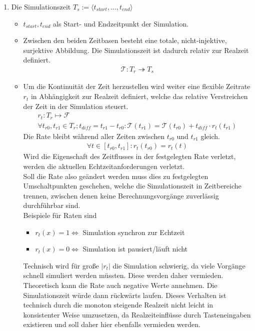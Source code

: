 \begin{enumerate}
\item Die Simulationszeit $T_s := \langle t_{start}, ... , t_{end}\rangle$
	\begin{itemize}
	\item $t_{start}, t_{end}$ als Start- und Endzeitpunkt der Simulation.
	\item Zwischen den beiden Zeitbasen besteht eine totale, nicht-injektive, surjektive Abbildung. Die Simulationszeit ist dadurch relativ zur Realzeit definiert.
\begin{align}
	\mathcal{T}:T_r \twoheadrightarrow T_s
\end{align}
	\item Um die Kontinuität der Zeit herzustellen wird weiter eine flexible Zeitrate $r_t$ in Abhängigkeit zur Realzeit definiert, welche das relative Verstreichen der Zeit in der Simulation steuert. 
\begin{align}
r_t:T_r\mapsto\mathcal{F}\\
 \forall t_{r0},  t_{r1} \in T_r ; t_{diff}=t_{r1}-t_{r0} :\mathcal{T}(t_{r1}) = \mathcal{T}(t_{r0}) + t_{diff}\cdot r_t(t_{r1})
\end{align}
Die Rate bleibt während aller Zeiten zwischen $t_{r0}$ und $t_{r1}$ gleich.
\begin{align}
 \forall t \in [ t_{r0},t_{r1}]: r_t( t_{r0}) = r_t(t)
\end{align} Wird die Eigenschaft des Zeitflusses in der festgelegten Rate verletzt, werden die aktuellen Echtzeitanforderungen verletzt. \\
	Soll die Rate also geändert werden muss dies zu festgelegten Umschaltpunkten geschehen, welche die Simulationszeit in Zeitbereiche trennen, zwischen denen keine Berechnungsvorgänge zuverlässig durchführbar sind.\\
Beispiele für Raten sind 
\begin{itemize}
\item $r_t(x) = 1 \Leftrightarrow$ Simulation synchron zur Echtzeit
\item $r_t(x) = 0 \Leftrightarrow$ Simulation ist pausiert/läuft nicht
\end{itemize}
Technisch wird für große $|r_t|$ die Simulation schwierig, da viele Vorgänge schnell simuliert werden müssten. Diese werden daher vermieden.\\
Theoretisch kann die Rate auch negative Werte annehmen. Die Simulationszeit würde dann rückwärts laufen. Dieses Verhalten ist technisch durch die monoton steigende Realzeit nicht leicht in konsistenter Weise umzusetzen, da Realzeiteinflüsse durch Tasteneingaben existieren und soll daher hier ebenfalls vermieden werden.
	\end{itemize}
\end{enumerate}	

